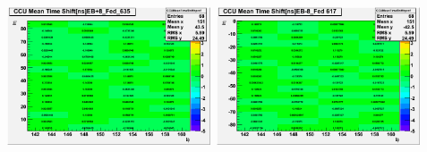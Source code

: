 \begin{center}
\centering
\mbox{\includegraphics[height=0.45\textwidth, width=0.45\textwidth]{THESISPLOTS/CCU_Mean_Time_ShiftEB_Plus8_Fed_635.png} \quad
\includegraphics[height=0.45\textwidth, width=0.45\textwidth]{THESISPLOTS/CCU-Mean-Time-Shift-EBMinus8-Fed617.png}}


\end{center}
